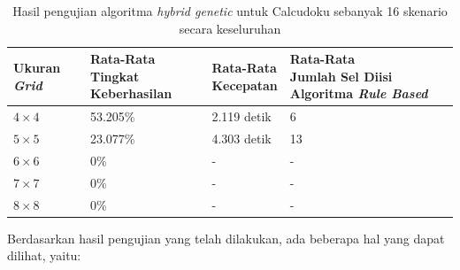\begin{table}
\centering
\captionsetup{justification=centering}
\caption[Hasil pengujian algoritma \textit{hybrid genetic} untuk Calcudoku sebanyak 16 skenario secara keseluruhan]{Hasil pengujian algoritma \textit{hybrid genetic} untuk Calcudoku sebanyak 16 skenario secara keseluruhan}
\begin{tabular}{| l | l | l | l |}
\hline
Ukuran \textit{Grid} & \makecell[c]{Rata-Rata \\ Tingkat Keberhasilan} & \makecell[c]{Rata-Rata \\ Kecepatan} & \makecell[c]{Rata-Rata \\ Jumlah Sel Diisi Algoritma \textit{Rule Based}} \\
\hline \hline
\begin{math}4 \times 4\end{math} & 53.205\% & 2.119 detik & 6 \\
\hline
\begin{math}5 \times 5\end{math} & 23.077\% & 4.303 detik & 13 \\
\hline
\begin{math}6 \times 6\end{math} & 0\% & - & - \\
\hline
\begin{math}7 \times 7\end{math} & 0\% & - & - \\
\hline
\begin{math}8 \times 8\end{math} & 0\% & - & - \\
\hline
\end{tabular}
\label{tab:pengujianhg}
\end{table}

\clearpage

Berdasarkan hasil pengujian yang telah dilakukan, ada beberapa hal yang dapat dilihat, yaitu:

